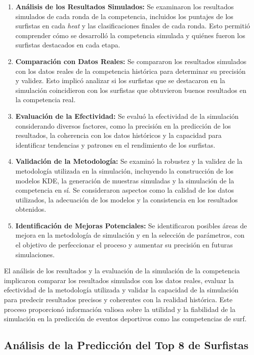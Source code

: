 \documentclass[12pt]{article}
\begin{document}
\begin{enumerate}
    \item \textbf{Análisis de los Resultados Simulados:} Se examinaron los resultados simulados de cada ronda de la competencia, incluidos los puntajes de los surfistas en cada \textit{heat} y las clasificaciones finales de cada ronda. Esto permitió comprender cómo se desarrolló la competencia simulada y quiénes fueron los surfistas destacados en cada etapa.
    \item \textbf{Comparación con Datos Reales:} Se compararon los resultados simulados con los datos reales de la competencia histórica para determinar su precisión y validez. Esto implicó analizar si los surfistas que se destacaron en la simulación coincidieron con los surfistas que obtuvieron buenos resultados en la competencia real.
    \item \textbf{Evaluación de la Efectividad:} Se evaluó la efectividad de la simulación considerando diversos factores, como la precisión en la predicción de los resultados, la coherencia con los datos históricos y la capacidad para identificar tendencias y patrones en el rendimiento de los surfistas.
    \item \textbf{Validación de la Metodología:} Se examinó la robustez y la validez de la metodología utilizada en la simulación, incluyendo la construcción de los modelos KDE, la generación de muestras simuladas y la simulación de la competencia en sí. Se consideraron aspectos como la calidad de los datos utilizados, la adecuación de los modelos y la consistencia en los resultados obtenidos.
    \item \textbf{Identificación de Mejoras Potenciales:} Se identificaron posibles áreas de mejora en la metodología de simulación y en la selección de parámetros, con el objetivo de perfeccionar el proceso y aumentar su precisión en futuras simulaciones.
\end{enumerate}

El análisis de los resultados y la evaluación de la simulación de la competencia implicaron comparar los resultados simulados con los datos reales, evaluar la efectividad de la metodología utilizada y validar la capacidad de la simulación para predecir resultados precisos y coherentes con la realidad histórica. Este proceso proporcionó información valiosa sobre la utilidad y la fiabilidad de la simulación en la predicción de eventos deportivos como las competencias de surf.

\subsection*{Análisis de la Predicción del Top 8 de Surfistas}
\end{document}
